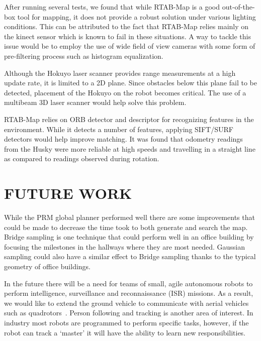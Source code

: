 \documentclass[letterpaper, 10 pt, conference]{ieeeconf}  %
\begin{document}
After running several tests, we found that while RTAB-Map is a good out-of-the-box tool for mapping, it does not provide a robust solution under various lighting conditions. This can be attributed to the fact that RTAB-Map relies mainly on the kinect sensor which is known to fail in these situations. A way to tackle this issue would be to employ the use of wide field of view cameras with some form of pre-filtering process such as histogram equalization.

Although the Hokuyo laser scanner provides range measurements at a high update rate, it is limited to a 2D plane. Since obstacles below this plane fail to be detected, placement of the Hokuyo on the robot becomes critical. The use of a multibeam 3D laser scanner would help solve this problem.

RTAB-Map relies on ORB detector and descriptor for recognizing features in the environment. While it detects a number of features, applying SIFT/SURF detectors would help improve matching. It was found that odometry readings from the Husky were more reliable at high speeds and travelling in a straight line as compared to readings observed during rotation.

\section{FUTURE WORK}

While the PRM global planner performed well there are some improvements that could be made to decrease the time took to both generate and search the map. Bridge sampling is one technique that could perform well in an office building by focusing the milestones in the hallways where they are most needed. Gaussian sampling could also have a similar effect to Bridge sampling thanks to the typical geometry of office buildings.

In the future there will be a need for teams of small, agile autonomous robots to perform intelligence, surveillance and reconnaissance (ISR) missions. As a result, we would like to extend the ground vehicle to communicate with aerial vehicles such as quadrotors~\cite{target}. Person following and tracking is another area of interest. In industry most robots are programmed to perform specific tasks, however, if the robot can track a \enquote*{master} it will have the ability to learn new responsibilities.

\addtolength{\textheight}{-12cm}   %





\end{document}
